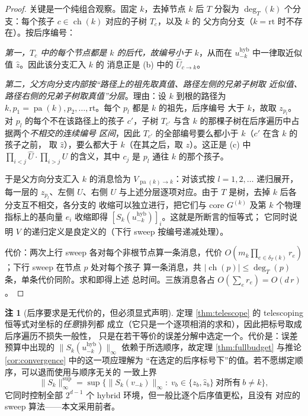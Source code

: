 \documentclass[a4paper,11pt]{article}
\theoremstyle{definition}
\newtheorem{remark}{注}
\newcommand{\1}{\mathbf 1}
\newcommand{\pa}{\operatorname{pa}}
\newcommand{\ch}{\operatorname{ch}}
\begin{document}
\begin{proof}
关键是一个纯组合观察。固定 $k$，去掉节点 $k$ 后 $T$ 分裂为
$\deg_T(k)$ 个分支：每个孩子 $c\in\ch(k)$ 对应的子树 $T_c$，以及 $k$ 的
父方向分支（$k=\mathrm{rt}$ 时不存在）。按后序编号：

\emph{第一，$T_c$ 中的每个节点都是 $k$ 的后代，故编号小于 $k$}，从而在
$u_{-k}^{\mathrm{hyb}}$ 中一律取近似值 $\widehat z$。因此该分支汇入 $k$ 的
消息正是 (b) 中的 $\widehat U_{c\to k}$。

\emph{第二，父方向分支内部按“路径上的祖先取真值、路径左侧的兄弟子树取
近似值、路径右侧的兄弟子树取真值”分层}。理由：设 $k$ 到根的路径为
$k,p_1=\pa(k),p_2,\ldots,\mathrm{rt}$。每个 $p_l$ 都是 $k$ 的祖先，后序编号
大于 $k$，故取 $z_{p_l}$。对 $p_l$ 的每个不在该路径上的孩子 $c'$，子树
$T_{c'}$ 与含 $k$ 的那棵子树在后序遍历中占据两个\emph{不相交的连续编号
区间}，因此 $T_{c'}$ 的全部编号要么都小于 $k$（$c'$ 在含 $k$ 的孩子之前，
取 $\widehat z$），要么都大于 $k$（在其之后，取 $z$）。这正是 (c) 中
$\prod_{i<j}\widehat U\cdot\prod_{i>j}U$ 的含义，其中 $c_j$ 是 $p_l$ 通往
$k$ 的那个孩子。

于是父方向分支汇入 $k$ 的消息恰为 $V_{\pa(k)\to k}$：对该式按
$l=1,2,\ldots$ 递归展开，每一层的 $z_{p_l}$、左侧 $\widehat U$、右侧 $U$
与上述分层逐项对应。由于 $T$ 是树，去掉 $k$ 后各分支互不相交，各分支的
收缩可以独立进行，把它们与 core $G^{(k)}$ 及第 $k$ 个物理指标上的基向量
$e_i$ 收缩即得 $[S_k(u_{-k}^{\mathrm{hyb}})]_i$。这就是所断言的恒等式；
它同时说明 $V$ 的递归定义是良定义的（下行 sweep 按编号递减处理）。

代价：两次上行 sweep 各对每个非根节点算一条消息，代价
$O(m_k\prod_{e\in\delta_T(k)}r_e)$；下行 sweep 在节点 $p$ 处对每个孩子
算一条消息，共 $|\ch(p)|\le\deg_T(p)$ 条，单条代价同阶。求和即得上述
总时间。三族消息各占 $O(\sum_er_e)=O(d\,r)$。
\end{proof}

\begin{remark}[后序要求是无代价的，但必须显式声明]
\label{rem:postorder}
定理 \ref{thm:telescope} 的 telescoping 恒等式对坐标的\emph{任意}排列都
成立（它只是一个逐项相消的求和），因此把标号取成后序遍历不损失一般性，
只是在若干等价的误差分解中选定一个。代价是：误差预算中出现的
$\|S_k(u_{-k}^{\mathrm{hyb}})\|_\infty$ 依赖于所选顺序，故定理
\ref{thm:fullbudget} 与推论 \ref{cor:convergence} 中的这一项应理解为
“在选定的后序标号下”的值。若不愿绑定顺序，可以退而使用与顺序无关的
一致上界
\[
\|S_k\|_\infty^{\sup}
=
\sup\bigl\{\|S_k(v_{-k})\|_\infty:\;
v_b\in\{z_b,\widehat z_b\}\ \text{对所有}\ b\ne k\bigr\},
\]
它同时控制全部 $2^{d-1}$ 个 hybrid 环境，但一般比逐个后序值更松，且没有
对应的 sweep 算法——本文采用前者。
\end{remark}
\end{document}
